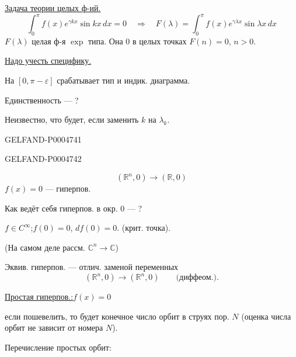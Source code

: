 \uline{Задача теории целых ф-ий.}
\[
\int_0^\pi f(x)e^{\gamma kx}\sin kx\,dx=0
\quad\Longrightarrow\quad
F(\lambda)=\int_0^\pi f(x)e^{\gamma\lambda x}\sin\lambda x\,dx
\]
$F(\lambda)$ целая ф-я $\exp$ типа. Она 0 в целых точках
$F(n)=0$, $n>0$.

\uline{Надо учесть специфику.}

На $[0,\pi-\varepsilon]$ срабатывает тип и индик. диаграмма.

Единственность — ?

Неизвестно, что будет, если заменить $k$ на $\lambda_k$.


\begin{GelfandAdjacentEvidence}{GELFAND-P000474}{1}
\qquad{}
\end{GelfandAdjacentEvidence}
\begin{GelfandAdjacentEvidence}{GELFAND-P000474}{2}

\[
(\mathbb R^n,0)\longrightarrow(\mathbb R,0)
\]
$f(x)=0$ — гиперпов.

Как ведёт себя гиперпов. в окр. $0$ — ?

$f\in C^\infty$;\quad $f(0)=0$, $df(0)=0$. (крит. точка).

(На самом деле рассм. $\mathbb C^n\longrightarrow\mathbb C$)

Эквив. гиперпов. — отлич. заменой переменных
\[
(\mathbb R^n,0)\longrightarrow(\mathbb R^n,0)\qquad
\text{(диффеом.)}.
\]

\uline{Простая гиперпов.:}\qquad\uline{\mbox{$f(x)=0$}}

если пошевелить, то будет конечное число орбит
в струях пор. $N$ (оценка числа орбит не зависит от номера $N$).

Перечисление простых орбит:
\end{GelfandAdjacentEvidence}
